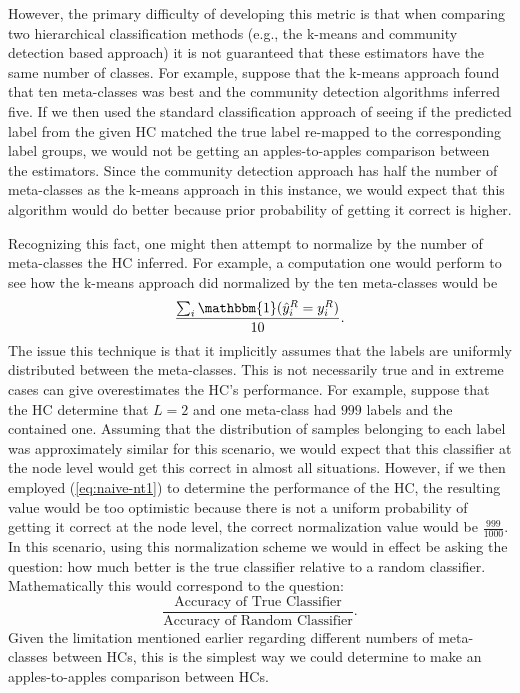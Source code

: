 \documentclass[../thesis.tex]{subfiles}
\begin{document}
However, the primary difficulty of developing this metric is that when comparing
two hierarchical classification methods (e.g., the k-means and community
detection based approach) it is not guaranteed that these estimators have the
same number of classes. For example, suppose that the k-means approach found
that ten meta-classes was best and the community detection algorithms inferred
five. If we then used the standard classification approach of seeing if the
predicted label from the given HC matched the true label re-mapped to the
corresponding label groups, we would not be getting an apples-to-apples
comparison between the estimators. Since the community detection approach has
half the number of meta-classes as the k-means approach in this instance, we
would expect that this algorithm would do better because prior probability of
getting it correct is higher.

Recognizing this fact, one might then attempt to normalize by the number of
meta-classes the HC inferred. For example, a computation one would perform to
see how the k-means approach did normalized by the ten meta-classes would be
\begin{equation}
    \label{eq:naive-nt1}
    \frac{\sum_i \mathbbm{1}(\hat{y}_i^R = y_i^R)}{10}.
\end{equation}
The issue this technique is that it implicitly assumes that the labels are
uniformly distributed between the meta-classes. This is not necessarily true and
in extreme cases can give overestimates the HC's performance. For example,
suppose that the HC determine that $L=2$ and one meta-class had $999$ labels and
the contained one. Assuming that the distribution of samples belonging to each
label was approximately similar for this scenario, we would expect that this
classifier at the node level would get this correct in almost all situations.
However, if we then employed (\ref{eq:naive-nt1}) to determine the performance
of the HC, the resulting value would be too optimistic because there is not a
uniform probability of getting it correct at the node level, the correct
normalization value would be $\frac{999}{1000}$. In this scenario, using this
normalization scheme we would in effect be asking the question: how much better
is the true classifier relative to a random classifier. Mathematically this
would correspond to the question:
\begin{equation*}
    \frac{\text{Accuracy of True Classifier}}{\text{Accuracy of Random Classifier}}.
\end{equation*}
Given the limitation mentioned earlier regarding different numbers of
meta-classes between HCs, this is the simplest way we could determine to make an
apples-to-apples comparison between HCs.
\end{document}
